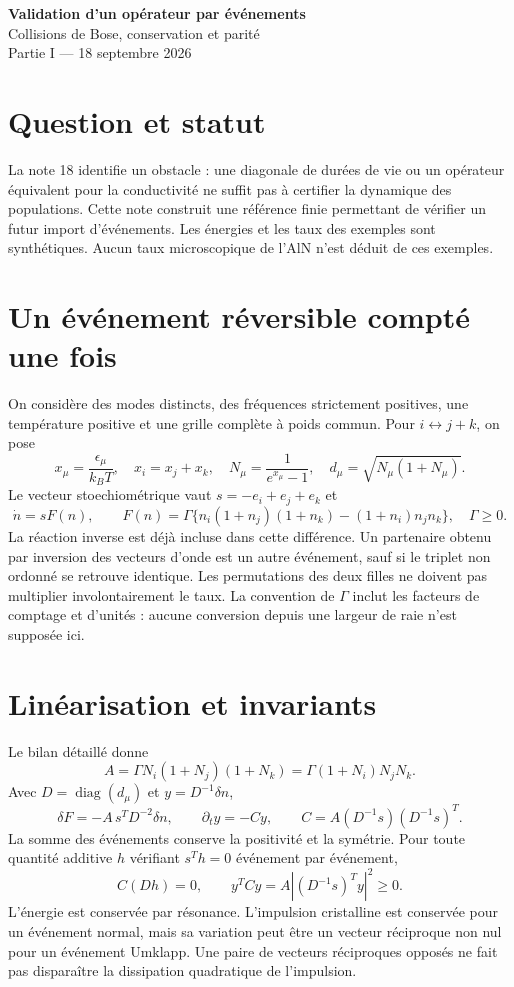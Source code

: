\documentclass[11pt,a4paper]{article}
\begin{document}
\begin{center}
{\Large\bfseries Validation d'un opérateur par événements}\\[4pt]
{\normalsize Collisions de Bose, conservation et parité}\\[2pt]
{\small Partie I --- 18 septembre 2026}
\end{center}
\section{Question et statut}
La note 18 identifie un obstacle : une diagonale de durées de vie ou un
opérateur équivalent pour la conductivité ne suffit pas à certifier la
dynamique des populations. Cette note construit une référence finie
permettant de vérifier un futur import d'événements.
Les énergies et les taux des exemples sont synthétiques. Aucun taux
microscopique de l'AlN n'est déduit de ces exemples.

\section{Un événement réversible compté une fois}
On considère des modes distincts, des fréquences strictement positives,
une température positive et une grille complète à poids commun.
Pour $i\leftrightarrow j+k$, on pose
\[
 x_\mu=\frac{\epsilon_\mu}{k_BT},\quad x_i=x_j+x_k,\quad
 N_\mu=\frac{1}{e^{x_\mu}-1},\quad
 d_\mu=\sqrt{N_\mu(1+N_\mu)}.
\]
Le vecteur stoechiométrique vaut $s=-e_i+e_j+e_k$ et
\[
 \dot n=sF(n),\qquad
 F(n)=\Gamma\{n_i(1+n_j)(1+n_k)-(1+n_i)n_jn_k\},\quad \Gamma\ge0.
\]
La réaction inverse est déjà incluse dans cette différence. Un partenaire
obtenu par inversion des vecteurs d'onde est un autre événement, sauf
si le triplet non ordonné se retrouve identique. Les permutations des deux
filles ne doivent pas multiplier involontairement le taux.
La convention de $\Gamma$ inclut les facteurs de comptage et d'unités :
aucune conversion depuis une largeur de raie n'est supposée ici.

\section{Linéarisation et invariants}
Le bilan détaillé donne
\[
 A=\Gamma N_i(1+N_j)(1+N_k)
   =\Gamma(1+N_i)N_jN_k .
\]
Avec $D=\operatorname{diag}(d_\mu)$ et $y=D^{-1}\delta n$,
\[
 \delta F=-A\,s^TD^{-2}\delta n,\qquad
 \partial_t y=-Cy,\qquad
 C=A(D^{-1}s)(D^{-1}s)^T.
\]
La somme des événements conserve la positivité et la symétrie.
Pour toute quantité additive $h$ vérifiant $s^Th=0$ événement par événement,
\[
 C(Dh)=0,\qquad y^TCy=A|(D^{-1}s)^Ty|^2\ge0.
\]
L'énergie est conservée par résonance. L'impulsion cristalline est
conservée pour un événement normal, mais sa variation peut être un
vecteur réciproque non nul pour un événement Umklapp.
Une paire de vecteurs réciproques opposés ne fait pas disparaître
la dissipation quadratique de l'impulsion.
\end{document}
